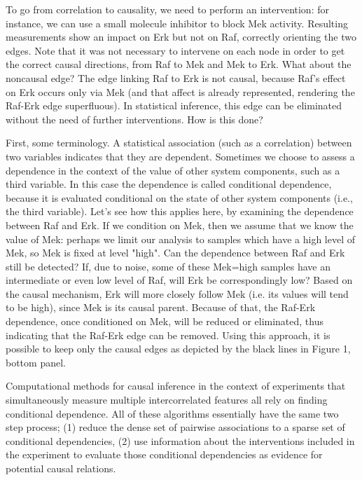 \documentclass[journal=jacsat,manuscript=article]{achemso}
\begin{document}
To go from correlation to causality, we need to perform an intervention:
for instance, we can use a small molecule inhibitor to block Mek
activity. Resulting measurements show an impact on Erk but not on Raf,
correctly orienting the two edges. Note that it was not necessary to
intervene on each node in order to get the correct causal directions,
from Raf to Mek and Mek to Erk. What about the noncausal edge? The edge
linking Raf to Erk is not causal, because Raf's effect on Erk occurs
only via Mek (and that affect is already represented, rendering the
Raf-Erk edge superfluous). In statistical inference, this edge can be
eliminated without the need of further interventions. How is this done?

First, some terminology. A statistical association (such as a
correlation) between two variables indicates that they are dependent.
Sometimes we choose to assess a dependence in the context of the value
of other system components, such as a third variable. In this case the
dependence is called conditional dependence, because it is evaluated
conditional on the state of other system components (i.e., the third
variable). Let's see how this applies here, by examining the dependence
between Raf and Erk. If we condition on Mek, then we assume that we know
the value of Mek: perhaps we limit our analysis to samples which have a high level
of Mek, so Mek is fixed at level "high". Can the dependence between
Raf and Erk still be detected? If, due to noise, some of these Mek=high
samples have an intermediate or even low level of Raf, will Erk be
correspondingly low? Based on the causal mechanism, Erk will more
closely follow Mek (i.e. its values will tend to be high), since Mek is 
its causal parent. Because of that, the Raf-Erk dependence, once conditioned 
on Mek, will be reduced or eliminated, thus indicating that the Raf-Erk edge 
can be removed. Using this approach, it is possible to keep only the causal edges 
as depicted by the black lines in Figure 1, bottom panel.

Computational methods for causal inference in the context of
experiments that simultaneously measure multiple intercorrelated
features all rely on finding conditional dependence.  All of these algorithms
essentially have the same two step process; (1)
reduce the dense set of pairwise associations to a sparse set of
conditional dependencies, (2) use information about the interventions
included in the experiment to evaluate those conditional dependencies as
evidence for potential causal relations.
\end{document}
